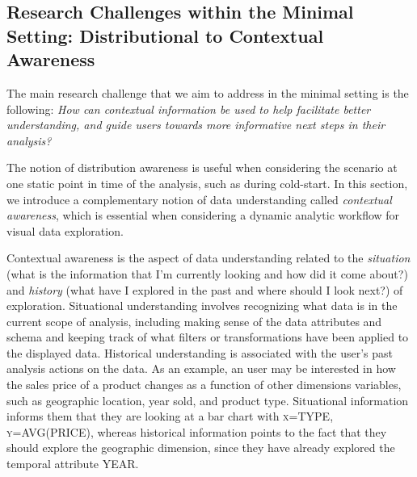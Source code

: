 \subsection{Research Challenges within the Minimal Setting: Distributional to Contextual Awareness}


The main research challenge that we aim to address in the minimal setting is the following: {\em How can contextual information be used to help facilitate better understanding, and guide users towards more informative next steps in their analysis?}

\par The notion of distribution awareness is useful when considering the scenario at one static point in time of the analysis, such as during cold-start. In this section, we introduce a complementary notion of data understanding called \textit{contextual awareness}, which is essential when considering a dynamic analytic workflow for visual data exploration.
\par Contextual awareness is the aspect of 
data understanding related to 
the \textit{situation} (what is the information 
that I'm currently looking and how did it come about?) 
and \textit{history} (what have I explored in the past 
and where should I look next?) of exploration. 
Situational understanding involves recognizing 
what data is in the current 
scope of analysis, 
including making sense of the data attributes 
and schema and keeping track of what filters or 
transformations have been applied to the displayed data. 
Historical understanding is associated with 
the user's past analysis actions on the data. 
As an example, an user may be interested 
in how the sales price of a product changes 
as a function of other dimensions variables, 
such as geographic location, year sold, and product type. 
Situational information informs them that they are 
looking at a bar chart with \textsc{x=TYPE}, \textsc{y=AVG(PRICE)}, 
whereas historical information points 
to the fact that they should explore the 
geographic dimension, since they have 
already explored the temporal attribute \textsc{YEAR}.

